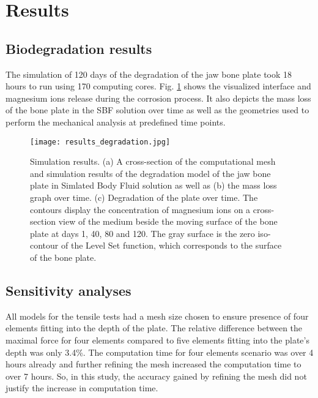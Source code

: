 
\section{Results}
\label{sec:results}

\subsection{Biodegradation results}

The simulation of 120 days of the degradation of the jaw bone plate took 18 hours to run using 170 computing cores. Fig. \ref{fig:results_degradation} shows the visualized interface and magnesium ions release during the corrosion process. It also depicts the mass loss of the bone plate in the \gls{SBF} solution over time as well as the geometries used to perform the mechanical analysis at predefined time points.

\begin{figure}[t]
\center \texttt{[image: results\_degradation.jpg]}
\caption[Simulation results of the degradation model of the jaw bone plate]{Simulation results. (a) A cross-section of the computational mesh and simulation results of the degradation model of the jaw bone plate in Simlated Body Fluid solution as well as (b) the mass loss graph over time. (c) Degradation of the plate over time. The contours display the concentration of magnesium ions on a cross-section view of the medium beside the moving surface of the bone plate at days 1, 40, 80 and 120. The gray surface is the zero iso-contour of the Level Set function, which corresponds to the surface of the bone plate.} \label{fig:results_degradation}
\end{figure}


\subsection{Sensitivity analyses}

All models for the tensile tests had a mesh size chosen to ensure presence of four elements fitting into the depth of the plate. The relative difference between the maximal force for four elements compared to five elements fitting into the plate’s depth was only 3.4\%. The computation time for four elements scenario was over 4 hours already and further refining the mesh increased the computation time to over 7 hours. So, in this study, the accuracy gained by refining the mesh did not justify the increase in computation time.

